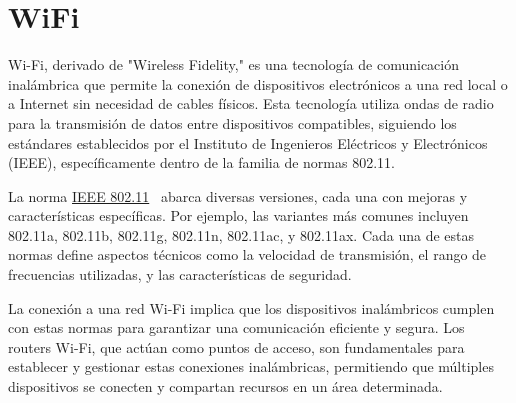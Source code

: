 \section{WiFi}\label{concepto:WIFI}
Wi-Fi, derivado de "Wireless Fidelity," es una tecnología de comunicación inalámbrica que permite la conexión de dispositivos electrónicos a una red local o a Internet sin necesidad de cables físicos. Esta tecnología utiliza ondas de radio para la transmisión de datos entre dispositivos compatibles, siguiendo los estándares establecidos por el Instituto de Ingenieros Eléctricos y Electrónicos (IEEE), específicamente dentro de la familia de normas 802.11.

La norma \underline{IEEE 802.11}~\cite{manual:IEEE802.11} abarca diversas versiones, cada una con mejoras y características específicas. Por ejemplo, las variantes más comunes incluyen 802.11a, 802.11b, 802.11g, 802.11n, 802.11ac, y 802.11ax. Cada una de estas normas define aspectos técnicos como la velocidad de transmisión, el rango de frecuencias utilizadas, y las características de seguridad.

La conexión a una red Wi-Fi implica que los dispositivos inalámbricos cumplen con estas normas para garantizar una comunicación eficiente y segura. Los routers Wi-Fi, que actúan como puntos de acceso, son fundamentales para establecer y gestionar estas conexiones inalámbricas, permitiendo que múltiples dispositivos se conecten y compartan recursos en un área determinada.

